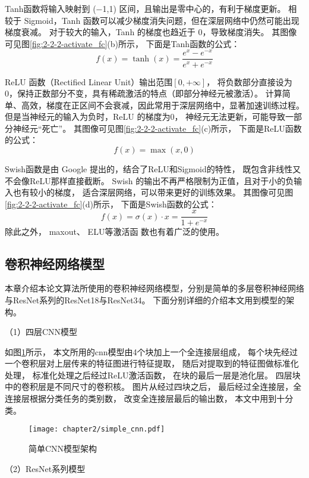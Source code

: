 Tanh函数将输入映射到 (−1,1) 区间，且输出是零中心的，有利于梯度更新。
相较于 Sigmoid，Tanh 函数可以减少梯度消失问题，但在深层网络中仍然可能出现梯度衰减。
对于较大的输入，Tanh 的梯度也趋近于 0，导致梯度消失。
其图像可见图\ref{fig:2-2-2-activate_fc}(b)所示，
下面是Tanh函数的公式：
\begin{equation}
    f(x) = \tanh(x) = \frac{e^x-e^{-x}}{e^x+e^{-x}}
\end{equation}

ReLU 函数（Rectified Linear Unit）输出范围$[0,+\infty]$，
将负数部分直接设为0，保持正数部分不变，具有稀疏激活的特点（即部分神经元被激活）。
计算简单、高效，梯度在正区间不会衰减，因此常用于深层网络中，显著加速训练过程。
但是当神经元的输入为负时，ReLU 的梯度为0，
神经元无法更新，可能导致一部分神经元“死亡”。
其图像可见图\ref{fig:2-2-2-activate_fc}(c)所示，
下面是ReLU函数的公式：
\begin{equation}
    f(x)=\max(x, 0)
\end{equation}

Swish函数是由 Google 提出的，结合了ReLU和Sigmoid的特性，
既包含非线性又不会像ReLU那样直接截断。
Swish 的输出不再严格限制为正值，且对于小的负输入也有较小的梯度，
适合深层网络，可以带来更好的训练效果。
其图像可见图\ref{fig:2-2-2-activate_fc}(d)所示，
下面是Swish函数的公式：
\begin{equation}
    f(x)= \sigma (x) \cdot x =\frac{x}{1+e^{-x}}
\end{equation}
除此之外， maxout\cite{goodfellow2013maxout}、 
ELU\cite{clevert2015fast}等激活函
数也有着广泛的使用。


\subsection{卷积神经网络模型}
本章介绍本论文算法所使用的卷积神经网络模型，分别是简单的多层卷积神经网络
与ResNet系列的ResNet18与ResNet34。
下面分别详细的介绍本文用到模型的架构。

（1）四层CNN模型

如图\ref{fig:2-2-3-simplecnn}所示，
本文所用的cnn模型由4个块加上一个全连接层组成，
每个块先经过一个卷积层对上层传来的特征图进行特征提取，
随后对提取到的特征图做标准化处理，
标准化处理之后经过ReLU激活函数，
在块的最后一层是池化层。
四层块中的卷积层是不同尺寸的卷积核。
图片从经过四块之后，
最后经过全连接层，全连接层根据分类任务的类别数，
改变全连接层最后的输出数，
本文中用到十分类。
\begin{figure}[H]
    \centering
    \texttt{[image: chapter2/simple\_cnn.pdf]}
    \caption{\label{fig:2-2-3-simplecnn}简单CNN模型架构}
\end{figure}
（2）ResNet系列模型

